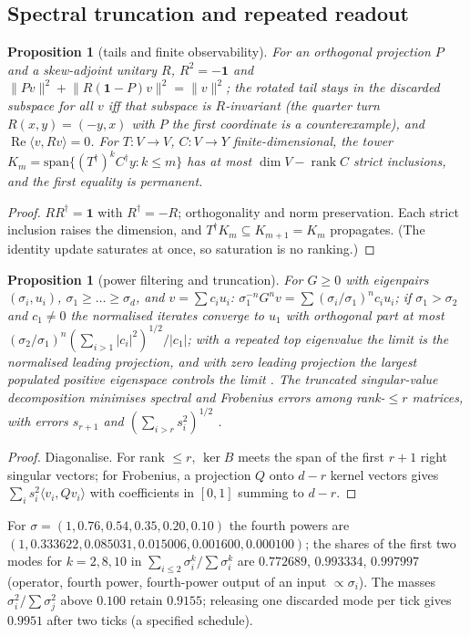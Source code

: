 \documentclass[aps,pra,onecolumn,superscriptaddress,nofootinbib,10pt]{revtex4-2}
\newtheorem{proposition}[theorem]{Proposition}
\theoremstyle{definition}
\theoremstyle{remark}
\newcommand{\rk}{\operatorname{rank}}
\newcommand{\re}{\operatorname{Re}}
\newcommand{\ip}[2]{\langle #1,#2\rangle}
\begin{document}
\subsection{Spectral truncation and repeated readout}\label{sec:sospectra}

\begin{proposition}[tails and finite observability]\label{prop:sotails}
For an orthogonal projection $P$ and a skew-adjoint unitary $R$, $R^2=-\mathbf1$ and $\lVert Pv\rVert^2+\lVert R(\mathbf1-P)v\rVert^2=\lVert v\rVert^2$; the rotated tail
stays in the discarded subspace for all $v$ iff that subspace is $R$-invariant (the quarter turn $R(x,y)=(-y,x)$ with $P$
the first coordinate is a counterexample), and $\re\ip v{Rv}=0$.  For $T\colon V\to V$, $C\colon V\to Y$ finite-dimensional, the tower
$K_m=\mathrm{span}\{(T^\dagger)^kC^\dagger y:k\le m\}$ has at most $\dim V-\rk C$ strict inclusions, and the first equality is permanent.
\end{proposition}
\begin{proof}
$RR^\dagger=\mathbf1$ with $R^\dagger=-R$; orthogonality and norm preservation.  Each strict inclusion raises the dimension, and
$T^\dagger K_m\subseteq K_{m+1}=K_m$ propagates.  (The identity update saturates at once, so saturation is no ranking.)
\end{proof}

\begin{proposition}[power filtering and truncation]\label{prop:sopower}
For $G\ge0$ with eigenpairs $(\sigma_i,u_i)$, $\sigma_1\ge\dots\ge\sigma_d$, and $v=\sum c_iu_i$: $\sigma_1^{-n}G^nv=\sum(\sigma_i/\sigma_1)^nc_iu_i$; if $\sigma_1>\sigma_2$ and $c_1\ne0$ the
normalised iterates converge to $u_1$ with orthogonal part at most $(\sigma_2/\sigma_1)^n(\sum_{i>1}\lvert c_i\rvert^2)^{1/2}/\lvert c_1\rvert$; with a repeated
top eigenvalue the limit is the normalised leading projection, and with zero leading projection the
largest populated positive eigenspace controls the limit \cite{n3:vonMises}.  The truncated singular-value
decomposition minimises spectral and Frobenius errors among rank-$\le r$ matrices, with errors $s_{r+1}$ and
$(\sum_{i>r}s_i^2)^{1/2}$ \cite{n3:EckartYoung,n3:Mirsky}.
\end{proposition}
\begin{proof}
Diagonalise.  For rank $\le r$, $\ker B$ meets the span of the first $r+1$ right singular vectors; for Frobenius, a projection
$Q$ onto $d-r$ kernel vectors gives $\sum_is_i^2\ip{v_i}{Qv_i}$ with coefficients in $[0,1]$ summing to $d-r$.
\end{proof}
\noindent For $\sigma=(1,0.76,0.54,0.35,0.20,0.10)$ the fourth powers are $(1,0.333622,0.085031,0.015006,0.001600,0.000100)$; the shares of the first
two modes for $k=2,8,10$ in $\sum_{i\le2}\sigma_i^k/\sum\sigma_i^k$ are $0.772689$, $0.993334$, $0.997997$ (operator, fourth power, fourth-power output of
an input $\propto\sigma_i$).  The masses $\sigma_i^2/\sum\sigma_j^2$ above $0.100$ retain $0.9155$; releasing one discarded mode per tick gives
$0.9951$ after two ticks (a specified schedule).
\end{document}
